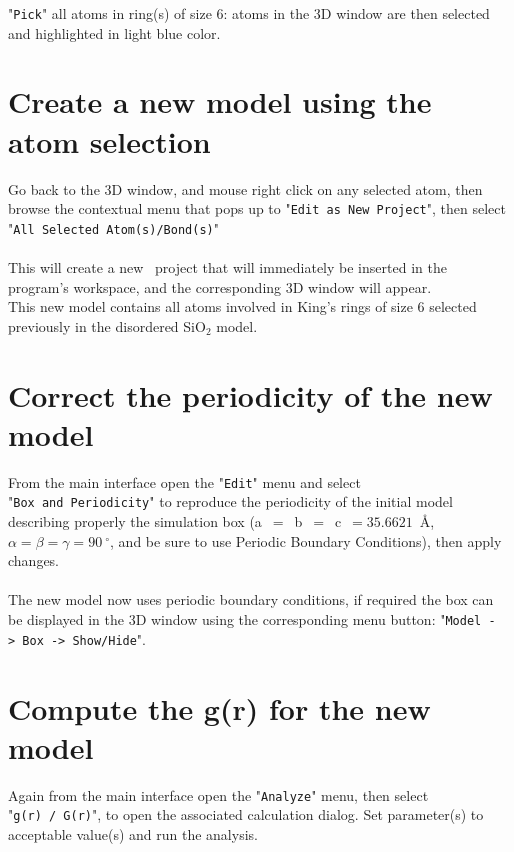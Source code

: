 "\texttt{Pick}" all atoms in ring(s) of size 6: atoms in the 3D window are then selected and highlighted in light blue color. \\[0.5cm]

\clearpage

\section{Create a new model using the atom selection} 

Go back to the 3D window, and mouse right click on any selected atom, then browse the contextual menu that pops up to "\texttt{Edit~as~New~Project}", 
then select "\texttt{All~Selected~Atom(s)/Bond(s)}" \\[0.5cm]
\editnewfig
\\[0.5cm]
This will create a new \atomes\ project that will immediately be inserted in the program's workspace, and the corresponding 3D window will appear. \\ 
This new model contains all atoms involved in King's rings of size 6 selected previously in the disordered SiO$_2$ model. 

\clearpage

\section{Correct the periodicity of the new model} 

From the main interface open the "\texttt{Edit}" menu and select "\texttt{Box~and~Periodicity}" 
to reproduce the periodicity of the initial model describing properly the simulation box (a~$=$~b~$=$~c~$= 35.6621$~\AA, $\alpha = \beta = \gamma = 90~^{\circ}$, and be sure to use Periodic Boundary Conditions), then apply changes. \\[0.5cm]
 \\[0.5cm]
The new model now uses periodic boundary conditions, if required the box can be displayed in the 3D window using the corresponding menu button: "\texttt{Model~->~Box~->~Show/Hide}".

\clearpage

\section{Compute the g(r) for the new model}

Again from the main interface open the "\texttt{Analyze}" menu, then select "\texttt{g(r)~/~G(r)}", to open the associated calculation dialog. 
Set parameter(s) to acceptable value(s) and run the analysis. \\[0.5cm] 

